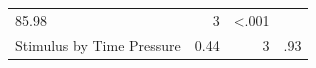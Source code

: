 \documentclass[11pt,]{article}
\begin{document}
\begin{longtable}[]{@{}lrrr@{}}
\begin{minipage}[t]{0.16\columnwidth}
85.98\strut
\end{minipage} & \begin{minipage}[t]{0.06\columnwidth}\raggedleft\strut
3\strut
\end{minipage} & \begin{minipage}[t]{0.06\columnwidth}\raggedleft\strut
\textless{}.001\strut
\end{minipage}\tabularnewline
\begin{minipage}[t]{0.32\columnwidth}\raggedright\strut
Stimulus by Time Pressure\strut
\end{minipage} & \begin{minipage}[t]{0.16\columnwidth}\raggedleft\strut
0.44\strut
\end{minipage} & \begin{minipage}[t]{0.06\columnwidth}\raggedleft\strut
3\strut
\end{minipage} & \begin{minipage}[t]{0.06\columnwidth}\raggedleft\strut
.93\strut
\end{minipage}\tabularnewline
\bottomrule
\end{longtable}
\end{document}
